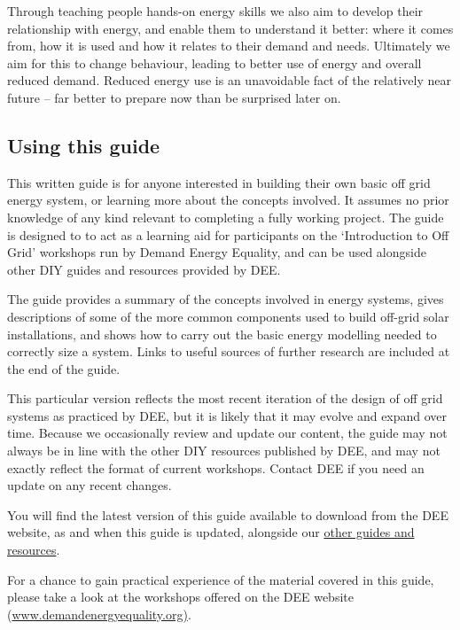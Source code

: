 \documentclass{article}
\theoremstyle{definition}
\theoremstyle{definition}
\theoremstyle{remark}
\begin{document}
    Through teaching people hands-on energy skills we also aim to develop their relationship with energy, and enable them to understand it better: where it comes from, how it is used and how it relates to their demand and needs. Ultimately we aim for this to change behaviour, leading to better use of energy and overall reduced demand. Reduced energy use is an unavoidable fact of the relatively near future – far better to prepare now than be surprised later on.

  
  {\color{blue}\subsection{Using this guide}} %
  \label{sub:using_this_guide}

    This written guide is for anyone interested in building their own basic off grid energy system, or learning more about the concepts involved. It assumes no prior knowledge of any kind relevant to completing a fully working project. The guide is designed to to act as a learning aid for participants on the ‘Introduction to Off Grid’ workshops run by Demand Energy Equality, and can be used alongside other DIY guides and resources provided by DEE. 

    The guide provides a summary of the concepts involved in energy systems, gives descriptions of some of the more common components used to build off-grid solar installations, and shows how to carry out the basic energy modelling needed to correctly size a system. Links to useful sources of further research are included at the end of the guide.

    This particular version reflects the most recent iteration of the design of off grid systems as practiced by DEE, but it is likely that it may evolve and expand over time.  Because we occasionally review and update our content, the guide may not always be in line with the other DIY resources published by DEE, and may not exactly reflect the format of current workshops. Contact DEE if you need an update on any recent changes. 

    You will find the latest version of this guide available to download from the DEE website, as and when this guide is updated, alongside our \href{https://www.demandenergyequality.org/resources/}{other guides and resources}.

    For a chance to gain practical experience of the material covered in this guide, please take a look at the workshops offered on the DEE website (\href{www.demandenergyequality.org}{www.demandenergyequality.org)}.
\end{document}
